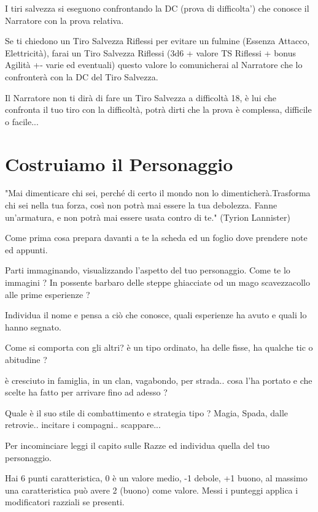 \documentclass[a4paper,11pt,twoside,openany]{book}
\begin{document}
I tiri salvezza si eseguono confrontando la DC (prova di difficolta') che conosce il Narratore con la prova relativa.

Se ti chiedono un Tiro Salvezza Riflessi per evitare un fulmine (Essenza Attacco, Elettricità), farai un Tiro Salvezza Riflessi (3d6 + valore TS Riflessi + bonus Agilità +- varie ed eventuali) questo valore lo comunicherai al Narratore che lo confronterà con la DC del Tiro Salvezza.

Il Narratore non ti dirà di fare un Tiro Salvezza a difficoltà 18, è lui che confronta il tuo tiro con la difficoltà, potrà dirti che la prova è complessa, difficile o facile...


\pagebreak

\section{Costruiamo il Personaggio}

\label{costruiamo-il-personaggio}
\begin{tcolorbox}[enhanced,arc=5pt,boxrule=0.3pt]{
		"Mai dimenticare chi sei, perché di certo il mondo non lo dimenticherà.Trasforma chi sei nella tua forza, così non potrà mai essere la tua debolezza. Fanne un'armatura, e non potrà mai essere usata contro di te." (Tyrion Lannister)
	}\end{tcolorbox}\medskip

Come prima cosa prepara davanti a te la scheda ed un foglio dove prendere note ed appunti.

Parti immaginando, visualizzando l'aspetto del tuo personaggio. Come te lo immagini ? In possente barbaro delle steppe ghiacciate od un mago scavezzacollo alle prime esperienze ?

Individua il nome e pensa a ciò che conosce, quali esperienze ha avuto e quali lo hanno segnato.

Come si comporta con gli altri? è un tipo ordinato, ha delle fisse, ha qualche tic o abitudine ?

è cresciuto in famiglia, in un clan, vagabondo, per strada.. cosa l'ha portato e che scelte ha fatto per arrivare fino ad adesso ?

Quale è il suo stile di combattimento e strategia tipo ? Magia, Spada, dalle retrovie.. incitare i compagni.. scappare...

Per incominciare leggi il capito sulle Razze ed individua quella del tuo personaggio.

Hai 6 punti caratteristica, 0 è un valore medio, -1 debole, +1 buono, al massimo una caratteristica può avere 2 (buono) come valore. Messi i punteggi applica i modificatori razziali se presenti.
\end{document}
